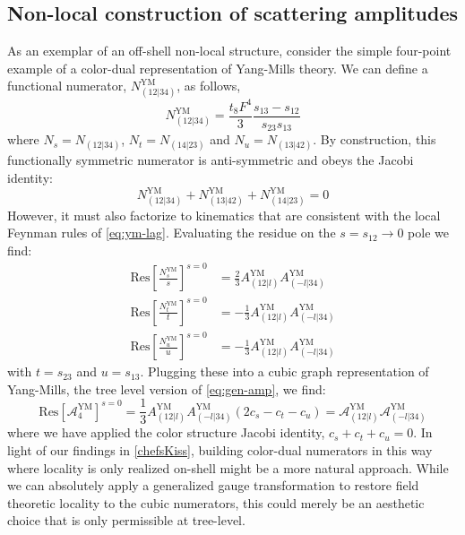 \documentclass[11pt,letter]{article}
\begin{document}
\subsection{Non-local construction of scattering amplitudes}
\label{nonLocalScattering}
As an exemplar of an off-shell non-local structure, consider the simple four-point example of a color-dual
representation of Yang-Mills theory. We can define a functional numerator, $N_{(12|34)}^{\text{YM}}$, as follows, 
\begin{equation}
N_{(12|34)}^{\text{YM}} = \frac{t_8F^4}{3} \frac{s_{13}-s_{12}}{s_{23}{s_{13}}}
\end{equation}
where $N_s = N_{(12|34)}$, $N_t = N_{(14|23)}$ and $N_u = N_{(13|42)}$. By construction, this functionally symmetric numerator is
anti-symmetric and obeys the Jacobi identity:
\begin{equation}\label{nonLocalNum}
N_{(12|34)}^{\text{YM}} + N_{(13|42)}^{\text{YM}} +N_{(14|23)}^{\text{YM}} = 0
\end{equation}
However, it must also factorize to kinematics that are consistent with
the local Feynman rules of \cref{eq:ym-lag}. Evaluating the residue on
the $s=s_{12} \to 0$ pole we find:
\begin{align}
\text{Res}\left[\frac{ N_{s}^{\text{YM}} }{s}\right]^{s=0}&= \frac{2}{3}A_{(12|l)}^{\text{YM}}A_{(-l|34)}^{\text{YM}} 
\\
\text{Res}\left[\frac{N_{t}^{\text{YM}} }{t}\right]^{s=0}&= -\frac{1}{3}A_{(12|l)}^{\text{YM}}A_{(-l|34)}^{\text{YM}} 
\\
\text{Res}\left[\frac{N_{u}^{\text{YM}} }{u}\right]^{s=0}&= -\frac{1}{3} A_{(12|l)}^{\text{YM}}A_{(-l|34)}^{\text{YM}} 
\end{align}
with $t=s_{23}$ and $u=s_{13}$.
Plugging these into a cubic graph representation of Yang-Mills, the
tree level version of \cref{eq:gen-amp}, we find:
\begin{equation}
  \text{Res}\left[\mathcal{A}_4^{\text{YM}}\right]^{s=0}
  = \frac{1}{3} A_{(12|l)}^{\text{YM}}A_{(-l|34)}^{\text{YM}} (2c_s-c_t-c_u)
  =  \mathcal{A}_{(12|l)}^{\text{YM}}\mathcal{A}_{(-l|34)}^{\text{YM}} 
\end{equation}
where we have applied the color structure Jacobi identity,
$c_s+c_t+c_u=0$. In light of our findings in \cref{chefsKiss}, building color-dual numerators in this way where locality is only realized on-shell might be a more natural approach. While we can absolutely apply a generalized gauge
transformation \cite{BCJ} to restore field theoretic locality to the
cubic numerators, this could merely be an aesthetic choice that is only permissible at tree-level.
\end{document}
